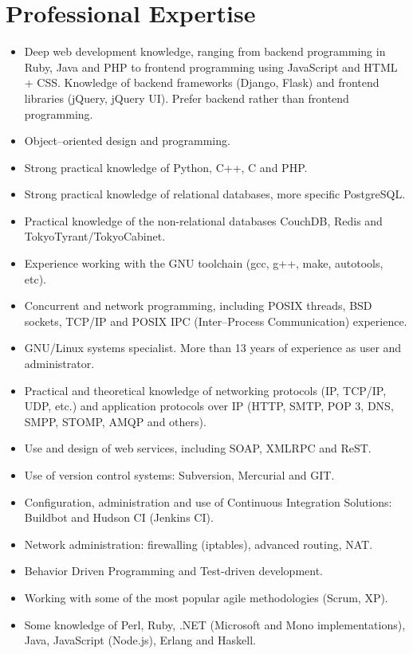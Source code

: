 \documentclass[a4paper,11pt]{moderncv}
\begin{document}
\section{Professional Expertise}
\begin{itemize}
\item Deep web development knowledge, ranging from backend programming in
  Ruby, Java and PHP to frontend programming using JavaScript and HTML + CSS.
  Knowledge of backend frameworks (Django, Flask) and frontend libraries
  (jQuery, jQuery UI). Prefer backend rather than frontend programming.
\item Object--oriented design and programming.
\item Strong practical knowledge of Python, C++, C and PHP.
\item Strong practical knowledge of relational databases, more specific
  PostgreSQL.
\item Practical knowledge of the non-relational databases CouchDB, Redis and
  TokyoTyrant/TokyoCabinet.
\item Experience working with the GNU toolchain (gcc, g++, make, autotools,
  etc).
\item Concurrent and network programming, including POSIX threads, BSD sockets,
  TCP/IP and POSIX IPC (Inter--Process Communication) experience.
\item GNU/Linux systems specialist. More than 13 years of experience as user
  and administrator.
\item Practical and theoretical knowledge of networking protocols (IP, TCP/IP,
  UDP, etc.) and application protocols over IP (HTTP, SMTP, POP 3, DNS, SMPP,
  STOMP, AMQP and others).
\item Use and design of web services, including SOAP, XMLRPC and ReST.
\item Use of version control systems: Subversion, Mercurial and GIT.
\item Configuration, administration and use of Continuous Integration
Solutions: Buildbot and Hudson CI (Jenkins CI).
\item Network administration: firewalling (iptables), advanced routing, NAT.
\item Behavior Driven Programming and Test-driven development.
\item Working with some of the most popular agile methodologies (Scrum, XP).
\item Some knowledge of Perl, Ruby, .NET (Microsoft and Mono implementations),
  Java, JavaScript (Node.js), Erlang and Haskell.
\end{itemize}
\end{document}
